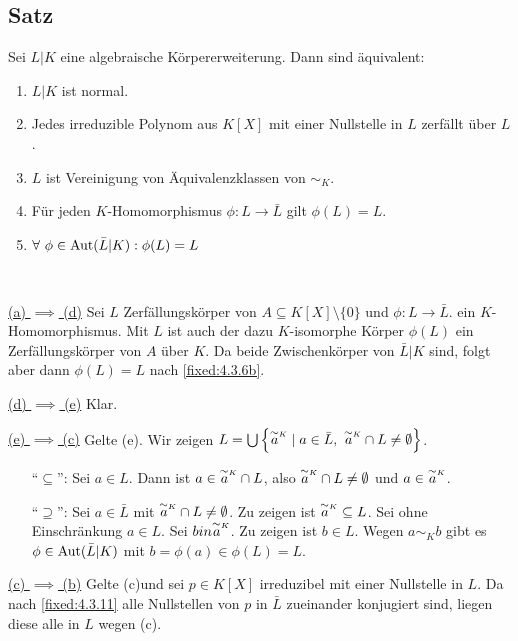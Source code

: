 \subsection{Satz} Sei $L|K$ eine algebraische Körpererweiterung. Dann sind äquivalent:
\begin{enumerate}[label=(\alph*)]
	\item
		$L|K$ ist normal.
		
	\item
		Jedes irreduzible Polynom aus $K[X]$ mit einer Nullstelle in $L$ zerfällt über $L$.
		
	\item
		$L$ ist Vereinigung von Äquivalenzklassen von $\sim_K$.
		
	\item
		Für jeden $K$-Homomorphismus $\phi: L \to \bar L$ gilt $\phi(L) = L$.
		
	\item
		$\forall~\phi \in \operatorname{Aut}(\bar L|K) : \phi(L)=L$
\end{enumerate}

\proof ~

\underline{(a) $\implies$ (d)} Sei $L$ Zerfällungskörper von $A \subseteq K[X] \setminus \{0\}$ und $\phi : L \to \bar L$. ein $K$-Homomorphismus. Mit $L$  ist auch der dazu $K$-isomorphe Körper $\phi(L)$ ein Zerfällungskörper von $A$ über $K$. Da beide Zwischenkörper von $\bar L|K$ sind, folgt aber dann $\phi(L) = L$ nach \ref{fixed:4.3.6b}.

\underline{(d) $\implies$ (e)} Klar.

\underline{(e) $\implies$ (c)} Gelte (e). Wir zeigen $L = \bigcup \left\{ \tildeidx aK \mid a \in \bar L,~\tildeidx aK \cap L \neq \emptyset \right\}$.
\begin{itemize}
	\item["`$\subseteq$"':]
		Sei $a \in L$. Dann ist $a \in \tildeidx aK \cap L$, also $\tildeidx aK \cap L \neq \emptyset$ und $a \in \tildeidx aK$.
		
	\item["`$\supseteq$"':]
		Sei $a \in \bar L$ mit $\tildeidx aK \cap L \neq \emptyset$. Zu zeigen ist $\tildeidx aK \subseteq L$. Sei ohne Einschränkung $a \in L$. Sei $b in \tildeidx aK$. Zu zeigen ist $b \in L$. Wegen $a \sim_K b$ gibt es $\phi \in \operatorname{Aut}(\bar L|K)$ mit $b = \phi(a) \in \phi(L) = L$.
\end{itemize}

\underline{(c) $\implies$ (b)} Gelte (c)und sei $p \in K[X]$ irreduzibel mit einer Nullstelle in $L$. Da nach \ref{fixed:4.3.11} alle Nullstellen von $p$ in $\bar L$ zueinander konjugiert sind, liegen diese alle in $L$ wegen (c).


